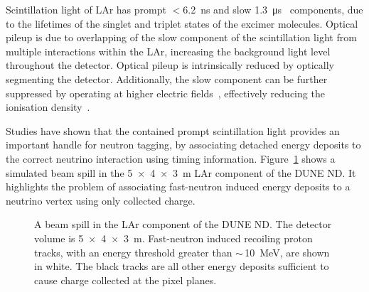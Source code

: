 \documentclass[a4paper]{article}
\begin{document}
Scintillation light of LAr has prompt $<$\SI{6.2}{\nano\second} and slow \SI{1.3}{\micro\second}~\cite{scintillation} components, due to the lifetimes of the singlet and triplet states of the excimer molecules.
Optical pileup is due to overlapping of the slow component of the scintillation light from multiple interactions within the LAr, increasing the background light level throughout the detector.    
Optical pileup is intrinsically reduced by optically segmenting the detector.
Additionally, the slow component can be further suppressed by operating at higher electric fields~\cite{scintillationEfield}, effectively reducing the ionisation density~\cite{scintillationdEdx}. 

Studies have shown that the contained prompt scintillation light provides an important handle for neutron tagging, by associating detached energy deposits to the correct neutrino interaction using timing information. 
Figure~\ref{fig:NDSpill} shows a simulated beam spill in the \SI[product-units=repeat]{5x4x3}{\metre} LAr component of the DUNE ND. 
It highlights the problem of associating fast-neutron induced energy deposits to a neutrino vertex using only collected charge.  

\begin{figure}[htb]
	\caption{A beam spill in the LAr component of the DUNE ND. 
		The detector volume is \SI[product-units=repeat]{5x4x3}{\metre}.
		Fast-neutron induced recoiling proton tracks, with an energy threshold greater than $\sim\,$\SI{10}{\mega\electronvolt}, are shown in white.
		The black tracks are all other energy deposits sufficient to cause charge collected at the pixel planes.}
	\label{fig:NDSpill}
\end{figure}
\end{document}
